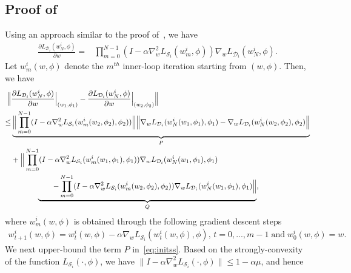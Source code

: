 \documentclass{osudissert96}
\begin{document}
\subsection*{Proof of~ }
Using an approach similar to the proof of~, we have
\begin{align}\label{eq:ainiyo}
\frac{\partial L_{\mathcal{D}_i}( w^i_{N}, \phi)}{\partial w} =& \prod_{m=0}^{N-1}(I - \alpha \nabla_w^2L_{\mathcal{S}_i}(w_{m}^i,\phi)) \nabla_{w} L_{\mathcal{D}_i} (w_{N}^i,\phi). 
\end{align}
Let $w_m^i(w,\phi)$ denote the $m^{th}$ inner-loop iteration starting from $(w,\phi)$. Then, we have
{\small 
\begin{align}\label{eq:initss}
\Big\| &\frac{\partial L_{\mathcal{D}_i}( w^i_N,\phi)}{\partial w} \Big |_{(w_1,\phi_1)} -  \frac{\partial L_{\mathcal{D}_i}( w^i_N,\phi)}{\partial w} \Big |_{(w_2,\phi_2)} \Big\| \nonumber
\\ \leq & \underbrace{\Big\|\prod_{m=0}^{N-1}(I - \alpha \nabla_w^2L_{\mathcal{S}_i}(w_{m}^i(w_2,\phi_2),\phi_2)) \Big\|\Big\|\nabla_{w} L_{\mathcal{D}_i} (w_{N}^i(w_1,\phi_1),\phi_1)-\nabla_{w} L_{\mathcal{D}_i} (w_{N}^i(w_2,\phi_2),\phi_2)\Big\|}_{P} \nonumber
\\ &+\Big\|\prod_{m=0}^{N-1}(I - \alpha \nabla_w^2L_{\mathcal{S}_i}(w_{m}^i(w_1,\phi_1),\phi_1)) \nabla_{w} L_{\mathcal{D}_i} (w_{N}^i(w_1,\phi_1),\phi_1)\nonumber
\\&\hspace{1.2cm}\underbrace{\hspace{0.7cm}-\prod_{m=0}^{N-1}(I - \alpha \nabla_w^2L_{\mathcal{S}_i}(w_{m}^i(w_2,\phi_2),\phi_2)) \nabla_{w} L_{\mathcal{D}_i} (w_{N}^i(w_1,\phi_1),\phi_1)\Big\|}_{Q}, 
\end{align}
}
\hspace{-0.12cm}where $w_m^i(w,\phi)$ is obtained through the following gradient descent steps
\begin{align}\label{eq:updates}
w_{t+1}^i(w,\phi) = w_{t}^i(w,\phi) - \alpha \nabla_{w} L_{\mathcal{S}_i} (w_{t}^i(w,\phi),\phi),\, t=0,...,m-1\;\text{and} \;w_0^i(w,\phi)=w.
\end{align}
We next upper-bound the term $P$ in~\cref{eq:initss}. Based on the strongly-convexity of the function $L_{\mathcal{S}_i}(\cdot,\phi)$, we have $\big\|I-\alpha\nabla_w^2L_{\mathcal{S}_i}(\cdot,\phi)\big\|\leq 1-\alpha \mu$, and hence 
\end{document}

